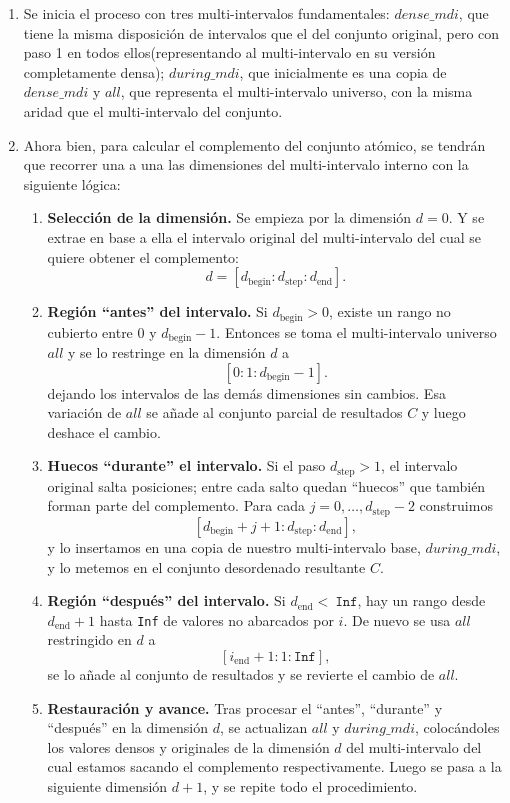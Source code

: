 \begin{enumerate}
    \item Se inicia el proceso con tres multi-intervalos fundamentales: $dense\_mdi$, que tiene la misma disposición de intervalos que el del conjunto original, pero con paso 1 en todos ellos(representando al multi-intervalo en su versión completamente densa); $during\_mdi$, que inicialmente es una copia de $dense\_mdi$ y $all$, que representa el multi-intervalo universo, con la misma aridad que el multi-intervalo del conjunto.

  \item Ahora bien, para calcular el complemento del conjunto atómico, se tendrán que recorrer una a una las dimensiones del multi-intervalo interno con la siguiente lógica:
  \begin{enumerate}
    \item \textbf{Selección de la dimensión.}  
      Se empieza por la dimensión \(d=0\). Y se extrae en base a ella el intervalo original del multi-intervalo del cual se quiere obtener el complemento: 
      \[
        d = [d_{\mathrm{begin}}:d_{\mathrm{step}}:d_{\mathrm{end}}].
      \]
    \item \textbf{Región “antes” del intervalo.}  
      Si \(d_{\mathrm{begin}}>0\), existe un rango no cubierto entre \(0\) y \(d_{\mathrm{begin}}-1\). Entonces se toma el multi-intervalo universo \(\mathit{all}\) y se lo restringe en la dimensión \(d\) a  
      \[
        [0:1:d_{\mathrm{begin}}-1].
      \]
      dejando los intervalos de las demás dimensiones sin cambios. Esa variación de \(\mathit{all}\) se añade al conjunto parcial de resultados $C$ y luego deshace el cambio.
    \item \textbf{Huecos “durante” el intervalo.}  
      Si el paso \(d_{\mathrm{step}}>1\), el intervalo original salta posiciones; entre cada salto quedan “huecos” que también forman parte del complemento. Para cada \(j=0,\dots,d_{\mathrm{step}}-2\) construimos  
      \[
        [d_{\mathrm{begin}}+j+1:d_{\mathrm{step}}:d_{\mathrm{end}}],
      \]
      y lo insertamos en una copia de nuestro multi-intervalo base, $during\_mdi$, y lo metemos en el conjunto desordenado resultante $C$.
      
    \item \textbf{Región “después” del intervalo.}  
      Si \(d_{\mathrm{end}}<\ \texttt{Inf}\), hay un rango desde \(d_{\mathrm{end}}+1\) hasta \texttt{Inf} de valores no abarcados por $i$. De nuevo se usa \(\mathit{all}\) restringido en \(d\) a  
      \[
        [i_{\mathrm{end}}+1:1: \texttt{Inf}],
      \]
       se lo añade al conjunto de resultados y se revierte el cambio de $all$.
    \item \textbf{Restauración y avance.}  
      Tras procesar el “antes”, “durante” y “después” en la dimensión \(d\), se actualizan \(\mathit{all}\) y $during\_mdi$, colocándoles los valores densos y originales de la dimensión \(d\) del multi-intervalo del cual estamos sacando el complemento respectivamente. Luego se pasa a la siguiente dimensión \(d+1\), y se repite todo el procedimiento.
  \end{enumerate}
\end{enumerate}

